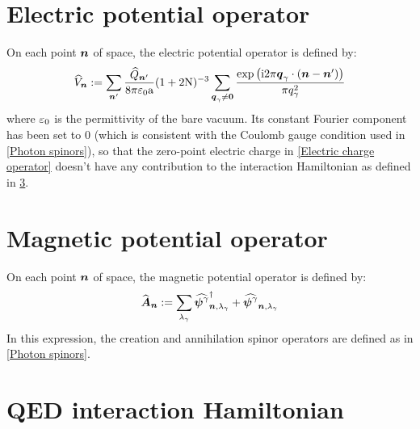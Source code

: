 \documentclass[10pt,a4paper,twoside,openany]{book}
\begin{document}
\section{Electric potential operator}

On each point $\boldsymbol{n}$ of space, the electric potential operator is defined by:
\begin{equation*}
\widehat{V}_{\boldsymbol{n}} := \sum_{\boldsymbol{n}'} \frac{\widehat{Q}_{\boldsymbol{n}'}}{8 \pi \mathrm \varepsilon_0 \mathrm a} ( 1 + 2 \mathrm N )^{-3} \sum_{\boldsymbol{q}_\gamma \neq \boldsymbol{0}} \frac{\mathrm{exp} \left( {\mathrm{i} 2 \pi \boldsymbol{q}_\gamma \cdot ( \boldsymbol{n} - \boldsymbol{n}' )} \right)}{\pi q_\gamma^2}
\end{equation*}
where $\mathrm \varepsilon_0$ is the permittivity of the bare vacuum. Its constant Fourier component has been set to $0$ (which is consistent with the Coulomb gauge condition used in \ref{Photon spinors}), so that the zero-point electric charge in \ref{Electric charge operator} doesn't have any contribution to the interaction Hamiltonian as defined in \ref{QED interaction Hamiltonian}.

\section{Magnetic potential operator}

On each point $\boldsymbol{n}$ of space, the magnetic potential operator is defined by:
\begin{equation*}
\widehat{\boldsymbol{A}}_{\boldsymbol{n}} := \sum_{\lambda_\gamma} \widehat{\boldsymbol{\psi}^{\gamma}}^{\dagger}_{{\boldsymbol{n}}, {\lambda_\gamma}} + \widehat{\boldsymbol{\psi}^{\gamma}}_{{\boldsymbol{n}}, {\lambda_\gamma}}
\end{equation*}
In this expression, the creation and annihilation spinor operators are defined as in \ref{Photon spinors}.

\section{QED interaction Hamiltonian}
\label{QED interaction Hamiltonian}
\end{document}
